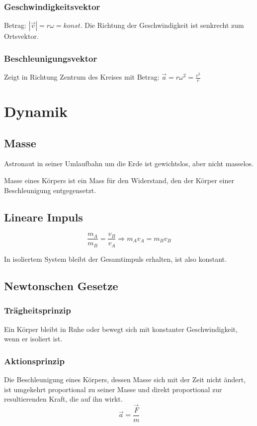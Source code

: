 \documentclass[11pt]{article}
\begin{document}
\subsubsection{Geschwindigkeitsvektor}
Betrag: $|\vec{v}| = r \omega = konst.$ \newline
Die Richtung der Geschwindigkeit ist senkrecht zum Ortsvektor.

\subsubsection{Beschleunigungsvektor}
Zeigt in Richtung Zentrum des Kreises mit Betrag: $\vec{a} = r \omega ^2 = \frac{v^2}{r}$

\section{Dynamik}

\subsection{Masse}
Astronaut in seiner Umlaufbahn um die Erde ist gewichtslos, aber nicht masselos.

Masse eines K{\"o}rpers ist ein Mass f{\"u}r den Widerstand, den der K{\"o}rper einer Beschleunigung entgegensetzt.

\subsection{Lineare Impuls}

\begin{equation*}
	\frac{m_A}{m_B} = \frac{v_B}{v_A} \Rightarrow m_Av_A = m_Bv_B
\end{equation*}

In isoliertem System bleibt der Gesamtimpuls erhalten, ist also konstant.

\subsection{Newtonschen Gesetze}

\subsubsection{Tr{\"a}gheitsprinzip}
Ein K{\"o}rper bleibt in Ruhe oder bewegt sich mit konstanter Geschwindigkeit, wenn er isoliert ist.

\subsubsection{Aktionsprinzip}
Die Beschleunigung eines K{\"o}rpers, dessen Masse sich mit der Zeit nicht {\"a}ndert, ist umgekehrt proportional zu seiner Masse und direkt proportional zur resultierenden Kraft, die auf ihn wirkt.
\begin{equation*}
	\vec{a} = \frac{\vec{F}}{m}
\end{equation*}
\end{document}

